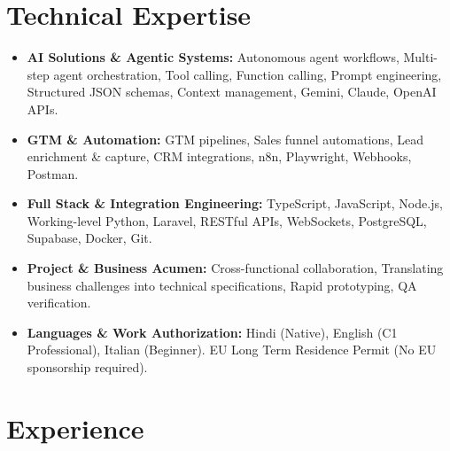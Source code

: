 \documentclass[10pt,a4paper]{article}
\begin{document}
\section{Technical Expertise}
\begin{itemize}
  \item \textbf{AI Solutions \& Agentic Systems:} Autonomous agent workflows, Multi-step agent orchestration, Tool calling, Function calling, Prompt engineering, Structured JSON schemas, Context management, Gemini, Claude, OpenAI APIs.
  \item \textbf{GTM \& Automation:} GTM pipelines, Sales funnel automations, Lead enrichment \& capture, CRM integrations, n8n, Playwright, Webhooks, Postman.
  \item \textbf{Full Stack \& Integration Engineering:} TypeScript, JavaScript, Node.js, Working-level Python, Laravel, RESTful APIs, WebSockets, PostgreSQL, Supabase, Docker, Git.
  \item \textbf{Project \& Business Acumen:} Cross-functional collaboration, Translating business challenges into technical specifications, Rapid prototyping, QA verification.
  \item \textbf{Languages \& Work Authorization:} Hindi (Native), English (C1 Professional), Italian (Beginner). EU Long Term Residence Permit (No EU sponsorship required).
\end{itemize}

\section{Experience}
\end{document}
